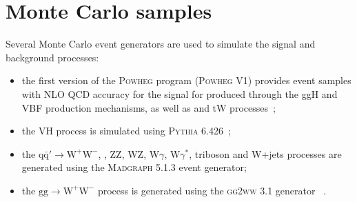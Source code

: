 %
%
%
%


\section{Monte Carlo samples\label{subsec:MC}}

Several Monte Carlo event generators are used to simulate the signal and background processes:
\begin{itemize}
\item the first version of the \textsc{Powheg} program (\textsc{Powheg V1}) provides event samples with NLO QCD accuracy for the \hww signal
for produced through the ggH and VBF production mechanisms, as well as \ttbar and tW processes~\cite{Alioli:2011as};
\item the VH process is simulated using \textsc{Pythia 6.426}~\cite{Sjostrand:2006za};
\item the $\mathrm{q\bar{q}'} \to \mathrm{W^{+}W^{-}}$, \dyll, ZZ, WZ, W$\gamma$, W$\gamma^*$, triboson and W+jets processes are generated using
the \textsc{Madgraph 5.1.3} event generator;
\item the $\mathrm{gg\to W^{+}W^{-}}$ process is generated using the \textsc{gg2ww} 3.1 generator ~\cite{Binoth:2006mf}.
\end{itemize}

